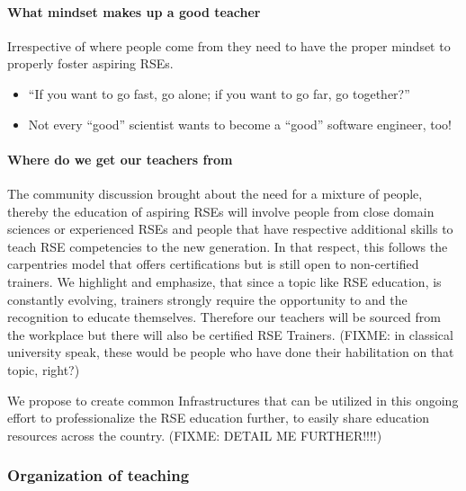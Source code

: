 \documentclass[a4paper
]{article}
\providecommand{\tightlist}{%
  \setlength{\itemsep}{0pt}\setlength{\parskip}{0pt}}
\begin{document}
\hypertarget{what-mindset-makes-up-a-good-teacher}{%
\paragraph{What mindset makes up a good
teacher}\label{what-mindset-makes-up-a-good-teacher}}

Irrespective of where people come from they need to have the proper
mindset to properly foster aspiring RSEs.

\begin{itemize}
\tightlist
\item
  ``If you want to go fast, go alone; if you want to go far, go
  together?''
\item
  Not every ``good'' scientist wants to become a ``good'' software
  engineer, too!
\end{itemize}

\hypertarget{where-do-we-get-our-teachers-from}{%
\paragraph{Where do we get our teachers
from}\label{where-do-we-get-our-teachers-from}}

The community discussion brought about the need for a mixture of people,
thereby the education of aspiring RSEs will involve people from close
domain sciences or experienced RSEs and people that have respective
additional skills to teach RSE competencies to the new generation. In
that respect, this follows the carpentries model that offers
certifications but is still open to non-certified trainers. We highlight
and emphasize, that since a topic like RSE education, is constantly
evolving, trainers strongly require the opportunity to and the
recognition to educate themselves. Therefore our teachers will be
sourced from the workplace but there will also be certified RSE
Trainers. (FIXME: in classical university speak, these would be people
who have done their habilitation on that topic, right?)

We propose to create common Infrastructures that can be utilized in this
ongoing effort to professionalize the RSE education further, to easily
share education resources across the country. (FIXME: DETAIL ME
FURTHER!!!!)

\hypertarget{organization-of-teaching}{%
\subsubsection{Organization of
teaching}\label{organization-of-teaching}}
\end{document}
